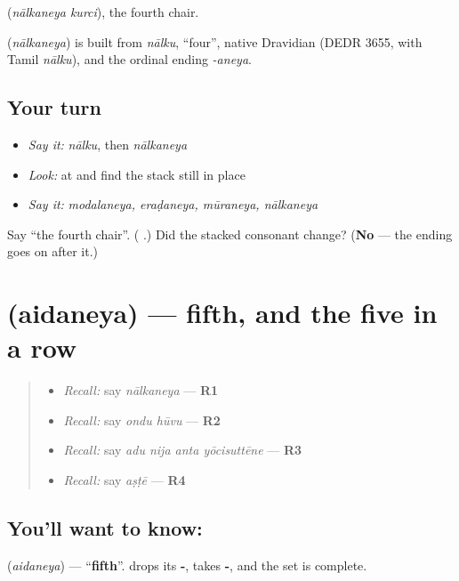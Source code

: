 \textbf{ } (\emph{nālkaneya kurci}), the fourth chair.

\begin{cousinweb}
\textbf{} (\emph{nālkaneya}) is built from \emph{nālku}, \textquotedblleft{}four\textquotedblright{}, native Dravidian (DEDR 3655, with Tamil \emph{nālku}), and the ordinal ending \emph{-aneya}.
\end{cousinweb}

\subsection*{Your turn}
\begin{itemize}
\raggedright
  \item \emph{Say it:} \emph{nālku}, then \emph{nālkaneya}
  \item \emph{Look:} at  and find the  stack still in place
  \item \emph{Say it:} \emph{modalaneya, eraḍaneya, mūraneya, nālkaneya}
\end{itemize}

\begin{tcolorbox}[breakable,colback=teal!4,colframe=teal!35!black,title={Before you move on}]
Say \textquotedblleft{}the fourth chair\textquotedblright{}. (\textbf{ }.) Did the stacked consonant change? (\textbf{No} — the ending goes on after it.)
\end{tcolorbox}
\section[Practice]{ (aidaneya) — fifth, and the five in a row}

\label{lesson:KA-C74-fifth}



\begin{quote}
\begin{itemize}
\raggedright
  \item \emph{Recall:} say \emph{nālkaneya} — \textbf{R1}
  \item \emph{Recall:} say \emph{ondu hūvu} — \textbf{R2}
  \item \emph{Recall:} say \emph{adu nija anta yōcisuttēne} — \textbf{R3}
  \item \emph{Recall:} say \emph{aṣṭē} — \textbf{R4}
\end{itemize}
\end{quote}

\subsection*{You'll want to know: }
\textbf{} (\emph{aidaneya}) — \textquotedblleft{}\textbf{fifth}\textquotedblright{}. \textbf{} drops its \textbf{-}, takes \textbf{-}, and the set is complete.


